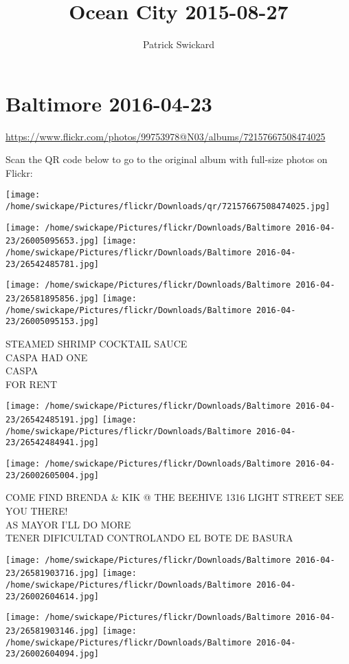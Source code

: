 \documentclass[10pt,letterpaper]{article}
\title{Ocean City 2015-08-27}
\author{Patrick Swickard}
\date{}
\begin{document}
\section*{Baltimore 2016-04-23}

\url{https://www.flickr.com/photos/99753978@N03/albums/72157667508474025}

Scan the QR code below to go to the original album with full-size photos on Flickr:

\texttt{[image: /home/swickape/Pictures/flickr/Downloads/qr/72157667508474025.jpg]}
\pagebreak

\texttt{[image: /home/swickape/Pictures/flickr/Downloads/Baltimore 2016-04-23/26005095653.jpg]}
\texttt{[image: /home/swickape/Pictures/flickr/Downloads/Baltimore 2016-04-23/26542485781.jpg]}

\texttt{[image: /home/swickape/Pictures/flickr/Downloads/Baltimore 2016-04-23/26581895856.jpg]}
\texttt{[image: /home/swickape/Pictures/flickr/Downloads/Baltimore 2016-04-23/26005095153.jpg]}

STEAMED SHRIMP COCKTAIL SAUCE\\
CASPA HAD ONE\\
CASPA\\
FOR RENT
\pagebreak

\texttt{[image: /home/swickape/Pictures/flickr/Downloads/Baltimore 2016-04-23/26542485191.jpg]}
\texttt{[image: /home/swickape/Pictures/flickr/Downloads/Baltimore 2016-04-23/26542484941.jpg]}

\vspace{0.25in}
\texttt{[image: /home/swickape/Pictures/flickr/Downloads/Baltimore 2016-04-23/26002605004.jpg]}

COME FIND BRENDA \& KIK @ THE BEEHIVE 1316 LIGHT STREET SEE YOU THERE!\\
AS MAYOR I'LL DO MORE\\
TENER DIFICULTAD CONTROLANDO EL BOTE DE BASURA
\pagebreak

\texttt{[image: /home/swickape/Pictures/flickr/Downloads/Baltimore 2016-04-23/26581903716.jpg]}
\texttt{[image: /home/swickape/Pictures/flickr/Downloads/Baltimore 2016-04-23/26002604614.jpg]}

\texttt{[image: /home/swickape/Pictures/flickr/Downloads/Baltimore 2016-04-23/26581903146.jpg]}
\texttt{[image: /home/swickape/Pictures/flickr/Downloads/Baltimore 2016-04-23/26002604094.jpg]}
\end{document}
